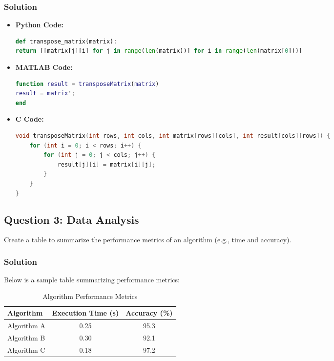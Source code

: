 \documentclass[11pt, a4paper]{article}
\begin{document}
	\subsubsection*{Solution}
	\begin{itemize}
		\item \textbf{Python Code:}
		\begin{lstlisting}[language=Python]
def transpose_matrix(matrix):
return [[matrix[j][i] for j in range(len(matrix))] for i in range(len(matrix[0]))]
		\end{lstlisting}
		\item \textbf{MATLAB Code:}
		\begin{lstlisting}[language=MATLAB]
function result = transposeMatrix(matrix)
result = matrix';
end
		\end{lstlisting}
		\item \textbf{C Code:}
		\begin{lstlisting}[language=C]
void transposeMatrix(int rows, int cols, int matrix[rows][cols], int result[cols][rows]) {
	for (int i = 0; i < rows; i++) {
		for (int j = 0; j < cols; j++) {
			result[j][i] = matrix[i][j];
		}
	}
}
		\end{lstlisting}
	\end{itemize}
	
	\subsection*{Question 3: Data Analysis}
	Create a table to summarize the performance metrics of an algorithm (e.g., time and accuracy).
	
	\subsubsection*{Solution}
	Below is a sample table summarizing performance metrics:
	\begin{table}[h]
		\centering
		\caption{Algorithm Performance Metrics}
		\begin{tabular}{lcc}
			\toprule
			\textbf{Algorithm} & \textbf{Execution Time (s)} & \textbf{Accuracy (\%)} \\
			\midrule
			Algorithm A & 0.25 & 95.3 \\
			Algorithm B & 0.30 & 92.1 \\
			Algorithm C & 0.18 & 97.2 \\
			\bottomrule
		\end{tabular}
	\end{table}
	
\end{document}
